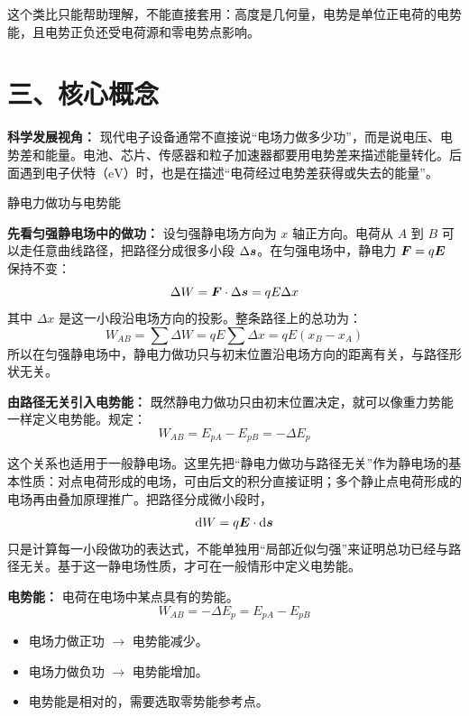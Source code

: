 这个类比只能帮助理解，不能直接套用：高度是几何量，电势是单位正电荷的电势能，且电势正负还受电荷源和零电势点影响。

\section*{三、核心概念}

\textbf{科学发展视角：} 现代电子设备通常不直接说“电场力做多少功”，而是说电压、电势差和能量。电池、芯片、传感器和粒子加速器都要用电势差来描述能量转化。后面遇到电子伏特（$\mathrm{eV}$）时，也是在描述“电荷经过电势差获得或失去的能量”。

\begin{conceptbox}{静电力做功与电势能}

\textbf{先看匀强静电场中的做功：} 设匀强静电场方向为 $x$ 轴正方向。电荷从 $A$ 到 $B$ 可以走任意曲线路径，把路径分成很多小段 $\Delta \boldsymbol{s}$。在匀强电场中，静电力 $\boldsymbol{F}=q\boldsymbol{E}$ 保持不变：
\[
\Delta W = \boldsymbol{F}\cdot \Delta \boldsymbol{s}=qE\Delta x
\]
其中 $\Delta x$ 是这一小段沿电场方向的投影。整条路径上的总功为：
\[
W_{AB}=\sum \Delta W=qE\sum \Delta x=qE(x_B-x_A)
\]
所以在匀强静电场中，静电力做功只与初末位置沿电场方向的距离有关，与路径形状无关。

\begin{center}


\label{fig:uniform-field-work-path}
\end{center}

\textbf{由路径无关引入电势能：} 既然静电力做功只由初末位置决定，就可以像重力势能一样定义电势能。规定：
\[
\boxed{W_{AB}=E_{pA}-E_{pB}=-\Delta E_p}
\]

这个关系也适用于一般静电场。这里先把“静电力做功与路径无关”作为静电场的基本性质：对点电荷形成的电场，可由后文的积分直接证明；多个静止点电荷形成的电场再由叠加原理推广。把路径分成微小段时，
\[
\mathrm{d}W=q\boldsymbol{E}\cdot\mathrm{d}\boldsymbol{s}
\]
只是计算每一小段做功的表达式，不能单独用“局部近似匀强”来证明总功已经与路径无关。基于这一静电场性质，才可在一般情形中定义电势能。

\textbf{电势能：} 电荷在电场中某点具有的势能。
\[
W_{AB} = -\Delta E_p = E_{pA} - E_{pB}
\]

\begin{itemize}
  \item 电场力做正功 $\to$ 电势能减少。
  \item 电场力做负功 $\to$ 电势能增加。
  \item 电势能是相对的，需要选取零势能参考点。
\end{itemize}

\end{conceptbox}

